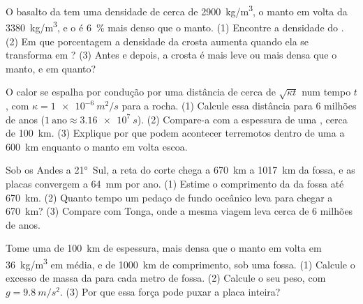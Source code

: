 \begin{exercise}[$\star\star$]\label{exo:g11:subduction-zones:11}
O basalto da  tem uma densidade de cerca de
\qty{2900}{kg/m^3}, o manto em volta da  \qty{3380}{kg/m^3}, e o
 é \qty{6}{\percent} mais denso que o manto. (1) Encontre a
densidade do . (2) Em que porcentagem a densidade da crosta aumenta
quando ela se transforma em ? (3) Antes e depois, a crosta é mais
leve ou mais densa que o manto, e em quanto?
\end{exercise}

\begin{exercise}[$\star\star\star$]\label{exo:g11:subduction-zones:12}
O calor se espalha por condução por uma distância de cerca de
$\sqrt{\kappa t}$ num tempo $t$, com $\kappa = \qty{1e-6}{m^2/s}$ para a
rocha. (1) Calcule essa distância para 6 milhões de anos ($1~\text{ano} \approx \qty{3.16e7}{s}$). (2) Compare-a
com a espessura de uma , cerca de \qty{100}{km}. (3) Explique por que
podem acontecer terremotos dentro de uma  a \qty{600}{km} enquanto o
manto em volta escoa.
\end{exercise}

\begin{exercise}[$\star\star\star$]\label{exo:g11:subduction-zones:13}
Sob os Andes a \ang{21}~Sul, a reta do corte chega a \qty{670}{km} a
\qty{1017}{km} da fossa, e as placas convergem a \qty{64}{mm} por ano.
(1) Estime o comprimento da  da fossa até \qty{670}{km}. (2) Quanto
tempo um pedaço de fundo oceânico leva para chegar a \qty{670}{km}?
(3) Compare com Tonga, onde a mesma viagem leva cerca de 6 milhões de anos.
\end{exercise}

\begin{exercise}[$\star\star\star$]\label{exo:g11:subduction-zones:14}
Tome uma  de \qty{100}{km} de espessura, mais densa que o manto em volta
em \qty{36}{kg/m^3} em média, e de \qty{1000}{km} de comprimento, sob uma
fossa. (1) Calcule o excesso de massa da  para cada metro de fossa.
(2) Calcule o seu peso, com $g = \qty{9.8}{m/s^2}$. (3) Por que essa força
pode puxar a placa inteira?
\end{exercise}

